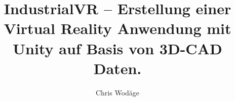 

\newcommand{\sieheKapitel}[1]{\glqq {#1}\grqq}
\newcommand{\sieheAbbVerweis}[2]{(siehe Abb. {#1} -- {#2})}
\newcommand{\sieheAbb}[1]{(siehe Abb. {#1})}
\newcommand{\sieheCA}[1]{(siehe Codeauszug {#1})}

\usepackage{chngcntr}
\usepackage[format=plain, justification=RaggedRight, singlelinecheck=false]{caption}

\logoPathL{} %
\gradeType{}
\secondExaminer{}

%

\title{IndustrialVR -- Erstellung einer Virtual Reality Anwendung mit Unity auf Basis von 3D-CAD Daten.}
\author{Chris Wodäge}

\makeindex[title=Stichwortverzeichnis, options=-s indexstyle.ist, intoc]

\makeglossaries
{}



\maketitle



\null\thispagestyle{empty}

 

\listoffigures \clearpage
\tableofcontents \newpage




 \clearpage
 \clearpage
 \clearpage
 \clearpage
 \clearpage

